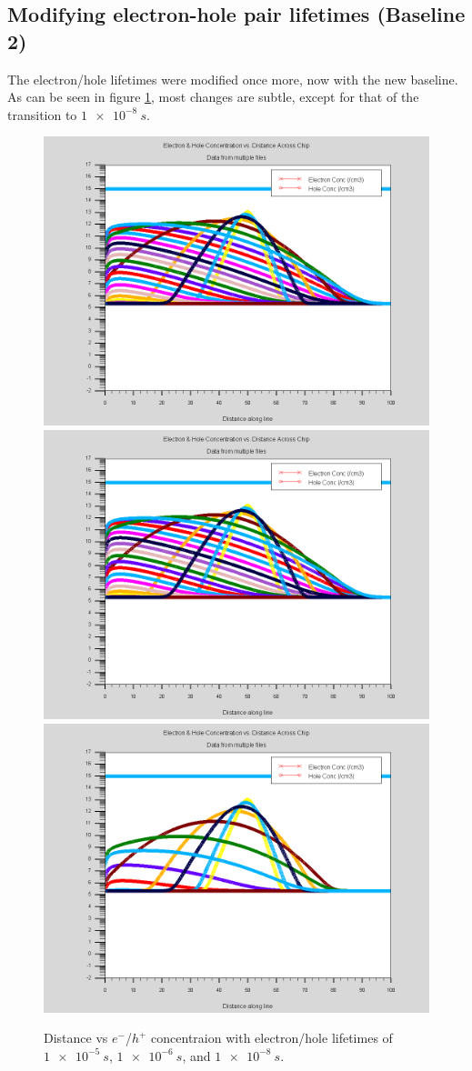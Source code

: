 \documentclass[12pt]{article}
\begin{document}
  \subsection{Modifying electron-hole pair lifetimes (Baseline 2)}
  The electron/hole lifetimes were modified once more, now with the new baseline. As can be seen in figure \ref{fig:distancevcurrent_lifetime_2}, most changes are subtle, except for that of the transition to $\SI{1e-8}{s}$.

\begin{figure}[htp]
  \centering
  \includegraphics[width=.3\textwidth]{lifetime_2_after1e-005s}\hfill
  \includegraphics[width=.3\textwidth]{lifetime_2_after1e-006s}\hfill
  \includegraphics[width=.3\textwidth]{lifetime_2_after1e-008s}
  \caption{Distance vs $e^-$/$h^+$ concentraion with electron/hole lifetimes of $\SI{1e-5}{s}$, $\SI{1e-6}{s}$, and $\SI{1e-8}{s}$.}
  \label{fig:distancevcurrent_lifetime_2}
\end{figure}



\end{document}
